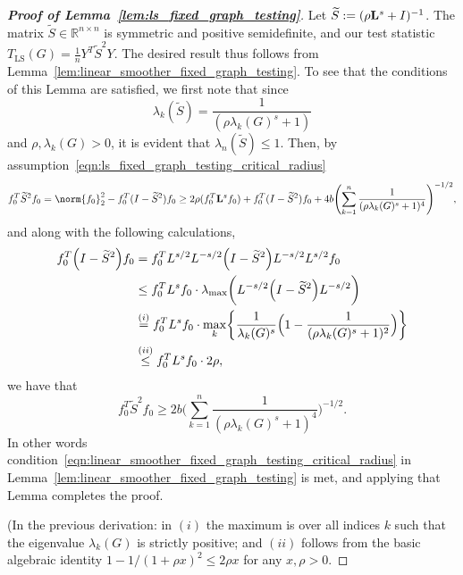 \documentclass{article}
\newcommand{\Reals}{\mathbb{R}}
\newcommand{\1}{\mathbf{1}}
\newcommand{\Lap}{{\bf L}}
\newcommand{\Id}{I}
\newcommand{\wt}[1]{\widetilde{#1}}
\newcommand{\LS}{\mathrm{LS}}
\theoremstyle{alden}
\theoremstyle{aldenthm}
\theoremstyle{definition}
\theoremstyle{remark}
\begin{document}
\begin{proof}[\textbf{Proof of Lemma~\ref{lem:ls_fixed_graph_testing}}]
	Let $\wt{S} := (\rho \Lap^s + \Id)^{-1}$. The matrix $\wt{S} \in \Reals^{n \times n}$ is symmetric and positive semidefinite, and our test statistic $T_{\LS}(G) = \frac{1}{n}Y^T \wt{S}^2 Y$. The desired result thus follows from Lemma~\ref{lem:linear_smoother_fixed_graph_testing}. To see that the conditions of this Lemma are satisfied, we first note that since
	\begin{equation*}
	\lambda_k(\wt{S}) = \frac{1}{(\rho\lambda_k(G)^s + 1)}
	\end{equation*}
	and $\rho, \lambda_k(G) > 0$, it is evident that $\lambda_{n}(\wt{S}) \leq 1$.  Then, by assumption~\eqref{eqn:ls_fixed_graph_testing_critical_radius}
	\begin{equation*}
	f_0^{T} \wt{S}^2 f_0 = \norm{f_0}_2^2 - f_0^T(I - \wt{S}^2)f_0 \geq 2 \rho (f_0^T \Lap^s f_0) + f_0^T(I - \wt{S}^2)f_0 + 4b \Biggl(\sum_{k = 1}^{n} \frac{1}{(\rho\lambda_k(G)^s + 1)^4} \Biggr)^{-1/2},
	\end{equation*}
	and along with the following calculations,
	\begin{equation*}
	\begin{aligned}
	f_0^T \Bigl(\Id - \wt{S}^2\Bigr) f_0  & = f_0^T L^{s/2} L^{-s/2}\Bigl(\Id - \wt{S}^2\Bigr) L^{-s/2} L^{s/2} f_0 \\ 
	& \leq f_0^T L^{s} f_0 \cdot  \lambda_{\max}\biggl(L^{-s/2}\Bigl(\Id - \wt{S}^2\Bigr) L^{-s/2}\biggr) \\ 
	& \overset{(i)}{=}  f_0^T L^{s} f_0 \cdot \max_{k} \biggl\{ \frac{1}{\lambda_k(G)^s} \Bigl(1 - \frac{1}{(\rho \lambda_k(G)^s + 1)^2}\Bigr) \biggr\} \\
	& \overset{(ii)}{\leq} f_0^T L^{s} f_0 \cdot 2\rho,
	\end{aligned}
	\end{equation*}
	we have that
	\begin{equation*}
	f_0^{T} \wt{S}^2 f_0 \geq 2b \biggl(\sum_{k = 1}^{n} \frac{1}{(\rho\lambda_k(G)^s + 1)^4} \biggr)^{-1/2}.
	\end{equation*} 
	In other words condition~\eqref{eqn:linear_smoother_fixed_graph_testing_critical_radius} in Lemma~\ref{lem:linear_smoother_fixed_graph_testing} is met, and applying that Lemma completes the proof.
	
	(In the previous derivation: in $(i)$ the maximum is over all indices $k$ such that the eigenvalue $\lambda_k(G)$ is strictly positive; and $(ii)$ follows from the basic algebraic identity $1 - 1/(1 + \rho x)^2 \leq 2 \rho x$ for any $x, \rho > 0$.
\end{proof}
\end{document}

